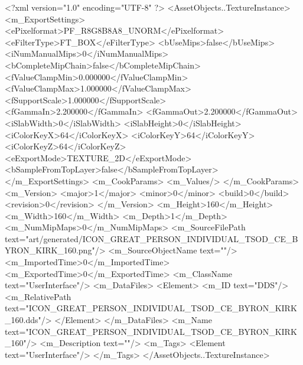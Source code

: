 <?xml version="1.0" encoding="UTF-8" ?>
<AssetObjects..TextureInstance>
	<m_ExportSettings>
		<ePixelformat>PF_R8G8B8A8_UNORM</ePixelformat>
		<eFilterType>FT_BOX</eFilterType>
		<bUseMips>false</bUseMips>
		<iNumManualMips>0</iNumManualMips>
		<bCompleteMipChain>false</bCompleteMipChain>
		<fValueClampMin>0.000000</fValueClampMin>
		<fValueClampMax>1.000000</fValueClampMax>
		<fSupportScale>1.000000</fSupportScale>
		<fGammaIn>2.200000</fGammaIn>
		<fGammaOut>2.200000</fGammaOut>
		<iSlabWidth>0</iSlabWidth>
		<iSlabHeight>0</iSlabHeight>
		<iColorKeyX>64</iColorKeyX>
		<iColorKeyY>64</iColorKeyY>
		<iColorKeyZ>64</iColorKeyZ>
		<eExportMode>TEXTURE_2D</eExportMode>
		<bSampleFromTopLayer>false</bSampleFromTopLayer>
	</m_ExportSettings>
	<m_CookParams>
		<m_Values/>
	</m_CookParams>
	<m_Version>
		<major>1</major>
		<minor>0</minor>
		<build>0</build>
		<revision>0</revision>
	</m_Version>
	<m_Height>160</m_Height>
	<m_Width>160</m_Width>
	<m_Depth>1</m_Depth>
	<m_NumMipMaps>0</m_NumMipMaps>
	<m_SourceFilePath text="art/generated/ICON_GREAT_PERSON_INDIVIDUAL_TSOD_CE_BYRON_KIRK_160.png"/>
	<m_SourceObjectName text=""/>
	<m_ImportedTime>0</m_ImportedTime>
	<m_ExportedTime>0</m_ExportedTime>
	<m_ClassName text="UserInterface"/>
	<m_DataFiles>
		<Element>
			<m_ID text="DDS"/>
			<m_RelativePath text="ICON_GREAT_PERSON_INDIVIDUAL_TSOD_CE_BYRON_KIRK_160.dds"/>
		</Element>
	</m_DataFiles>
	<m_Name text="ICON_GREAT_PERSON_INDIVIDUAL_TSOD_CE_BYRON_KIRK_160"/>
	<m_Description text=""/>
	<m_Tags>
		<Element text="UserInterface"/>
	</m_Tags>
</AssetObjects..TextureInstance>
